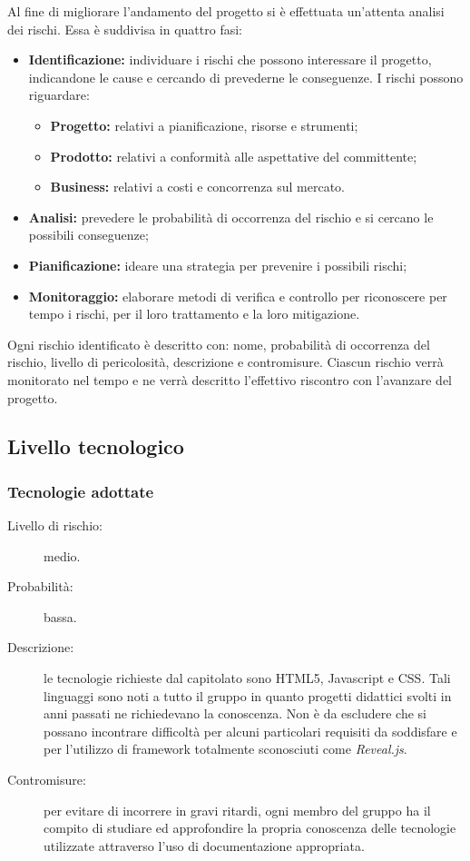 Al fine di migliorare l'andamento del progetto si è effettuata un'attenta analisi dei rischi. Essa è suddivisa in quattro fasi:
\begin{itemize}
	\item \textbf{Identificazione:} individuare i rischi che possono interessare il progetto, indicandone le cause e cercando di prevederne
	le conseguenze. I rischi possono riguardare:
	\begin{itemize}
		\item \textbf{Progetto:} relativi a pianificazione, risorse e strumenti;
		\item \textbf{Prodotto:} relativi a conformità alle aspettative del committente;
		\item \textbf{Business:} relativi a costi e concorrenza sul mercato.
	\end{itemize}
	\item \textbf{Analisi:} prevedere le probabilità di occorrenza del rischio e si cercano le possibili conseguenze;
	\item \textbf{Pianificazione:} ideare una strategia per prevenire i possibili rischi;
	\item \textbf{Monitoraggio:} elaborare metodi di verifica e controllo per riconoscere per tempo i rischi, per il loro trattamento e la loro mitigazione.
\end{itemize}
Ogni rischio identificato è descritto con: nome, probabilità di occorrenza del rischio, livello di pericolosità, descrizione e contromisure. Ciascun rischio verrà monitorato nel tempo e ne verrà descritto l'effettivo riscontro con l'avanzare del progetto.

\subsection{Livello tecnologico}
\subsubsection{Tecnologie adottate}
\begin{description}
	\item[Livello di rischio:] medio.
	\item[Probabilità:] bassa.
	\item[Descrizione:] le tecnologie richieste dal capitolato sono HTML5, Javascript e CSS. Tali linguaggi sono noti a tutto il gruppo in quanto progetti didattici svolti in anni passati ne richiedevano la conoscenza. Non è da escludere che si possano incontrare difficoltà per alcuni particolari requisiti da soddisfare e per l'utilizzo di framework totalmente sconosciuti come \textit{Reveal.js}.
	\item[Contromisure:] per evitare di incorrere in gravi ritardi, ogni membro del gruppo ha il compito di studiare ed approfondire la propria conoscenza delle tecnologie utilizzate attraverso l'uso di documentazione appropriata.
\end{description}
